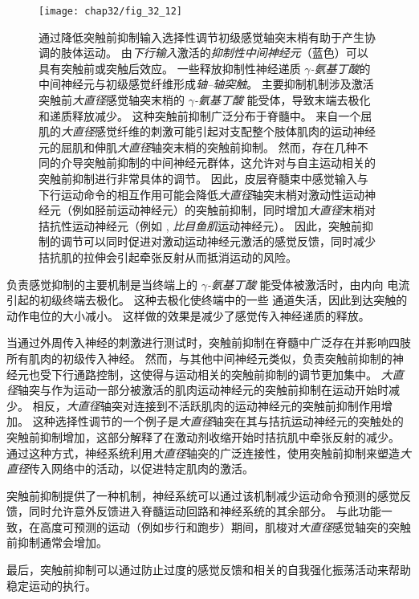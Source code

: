 \begin{figure}[htbp]
	\centering
	\texttt{[image: chap32/fig\_32\_12]}
	\caption{通过降低突触前抑制输入选择性调节初级感觉轴突末梢有助于产生协调的肢体运动。
		由\textit{下行输入}激活的\textit{抑制性中间神经元}（蓝色）可以具有突触前或突触后效应。
		一些释放抑制性神经递质 \textit{$ \gamma $-氨基丁酸}的中间神经元与初级感觉纤维形成\textit{轴–轴突触}。
		主要抑制机制涉及激活突触前\textit{大直径}感觉轴突末梢的 \textit{$ \gamma $-氨基丁酸} 能受体，导致末端去极化和递质释放减少。
		这种突触前抑制广泛分布于脊髓中。
		来自一个屈肌的\textit{大直径}感觉纤维的刺激可能引起对支配整个肢体肌肉的运动神经元的屈肌和伸肌\textit{大直径}轴突末梢的突触前抑制。
		然而，存在几种不同的介导突触前抑制的中间神经元群体，这允许对与自主运动相关的突触前抑制进行非常具体的调节。
		因此，皮层脊髓束中感觉输入与下行运动命令的相互作用可能会降低\textit{大直径}轴突末梢对激动性运动神经元（例如胫前运动神经元）的突触前抑制，同时增加\textit{大直径}末梢对拮抗性运动神经元（例如 , \textit{比目鱼肌}运动神经元）。
		因此，突触前抑制的调节可以同时促进对激动运动神经元激活的感觉反馈，同时减少拮抗肌的拉伸会引起牵张反射从而抵消运动的风险。}
	\label{fig:32_12}
\end{figure}


负责感觉抑制的主要机制是当终端上的 \textit{$ \gamma $-氨基丁酸} 能受体被激活时，由内向  电流引起的初级终端去极化。
这种去极化使终端中的一些  通道失活，因此到达突触的动作电位的大小减小。
这样做的效果是减少了感觉传入神经递质的释放。


当通过外周传入神经的刺激进行测试时，突触前抑制在脊髓中广泛存在并影响四肢所有肌肉的初级传入神经。
然而，与其他中间神经元类似，负责突触前抑制的神经元也受下行通路控制，这使得与运动相关的突触前抑制的调节更加集中。
\textit{大直径}轴突与作为运动一部分被激活的肌肉运动神经元的突触前抑制在运动开始时减少。
相反，\textit{大直径}轴突对连接到不活跃肌肉的运动神经元的突触前抑制作用增加。
这种选择性调节的一个例子是\textit{大直径}轴突在其与拮抗运动神经元的突触处的突触前抑制增加，这部分解释了在激动剂收缩开始时拮抗肌中牵张反射的减少。
通过这种方式，神经系统利用\textit{大直径}轴突的广泛连接性，使用突触前抑制来塑造\textit{大直径}传入网络中的活动，以促进特定肌肉的激活。


突触前抑制提供了一种机制，神经系统可以通过该机制减少运动命令预测的感觉反馈，同时允许意外反馈进入脊髓运动回路和神经系统的其余部分。
与此功能一致，在高度可预测的运动（例如步行和跑步）期间，肌梭对\textit{大直径}感觉轴突的突触前抑制通常会增加。


最后，突触前抑制可以通过防止过度的感觉反馈和相关的自我强化振荡活动来帮助稳定运动的执行。



